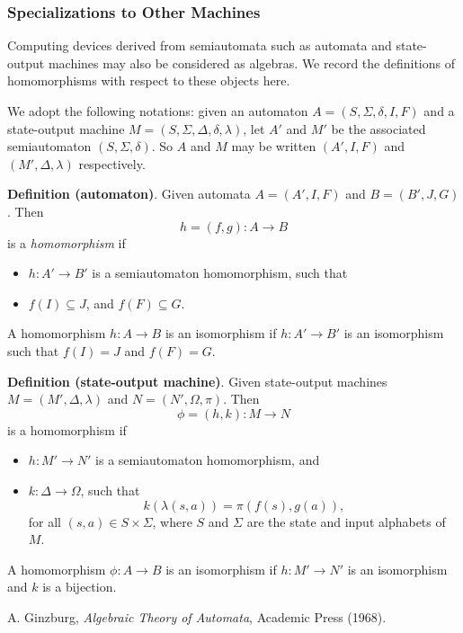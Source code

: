 \documentclass[12pt]{article}
\begin{document}
\subsubsection*{Specializations to Other Machines}

Computing devices derived from semiautomata such as automata and state-output machines may also be considered as algebras.  We record the definitions of homomorphisms with respect to these objects here.

We adopt the following notations: given an automaton $A=(S,\Sigma,\delta,I,F)$ and a state-output machine $M=(S,\Sigma,\Delta,\delta,\lambda)$, let $A'$ and $M'$ be the associated semiautomaton $(S,\Sigma,\delta)$.  So $A$ and $M$ may be written $(A',I,F)$ and $(M',\Delta,\lambda)$ respectively.

\textbf{Definition (automaton)}.  Given automata $A=(A',I,F)$ and $B=(B',J,G)$.  Then $$h=(f,g):A\to B$$ is a \emph{homomorphism} if 
\begin{itemize}
\item $h:A'\to B'$ is a semiautomaton homomorphism, such that 
\item $f(I)\subseteq J$, and $f(F)\subseteq G$.  
\end{itemize}
A homomorphism $h:A\to B$ is an isomorphism if $h:A'\to B'$ is an isomorphism such that $f(I)=J$ and $f(F)=G$.

\textbf{Definition (state-output machine)}.  Given state-output machines $M=(M',\Delta,\lambda)$ and $N=(N',\Omega,\pi)$.  Then $$\phi=(h,k): M\to N$$ is a homomorphism if 
\begin{itemize}
\item $h:M'\to N'$ is a semiautomaton homomorphism, and 
\item $k:\Delta \to \Omega$, such that $$k(\lambda(s,a))=\pi(f(s),g(a)),$$ for all $(s,a)\in S\times \Sigma$, where $S$ and $\Sigma$ are the state and input alphabets of $M$.
\end{itemize}
A homomorphism $\phi:A\to B$ is an isomorphism if $h:M'\to N'$ is an isomorphism and $k$ is a bijection.

\begin{thebibliography}{8}
 A. Ginzburg, {\em Algebraic Theory of Automata}, Academic Press (1968).
\end{thebibliography}
\end{document}
